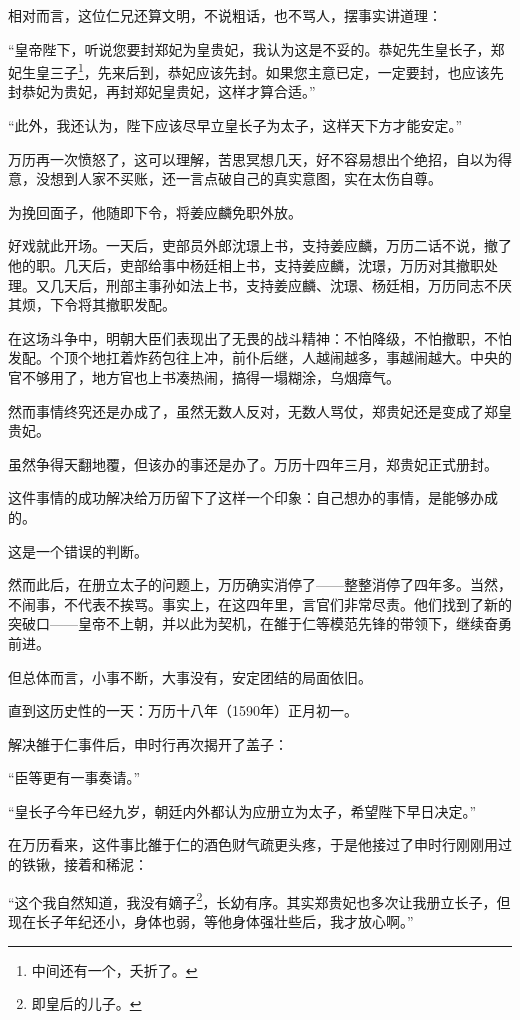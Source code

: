 \begin{multicols}{\theparacolNo}
相对而言，这位仁兄还算文明，不说粗话，也不骂人，摆事实讲道理：

“皇帝陛下，听说您要封郑妃为皇贵妃，我认为这是不妥的。恭妃先生皇长子，郑妃生皇三子\footnote{中间还有一个，夭折了。}，先来后到，恭妃应该先封。如果您主意已定，一定要封，也应该先封恭妃为贵妃，再封郑妃皇贵妃，这样才算合适。”

“此外，我还认为，陛下应该尽早立皇长子为太子，这样天下方才能安定。”

万历再一次愤怒了，这可以理解，苦思冥想几天，好不容易想出个绝招，自以为得意，没想到人家不买账，还一言点破自己的真实意图，实在太伤自尊。

为挽回面子，他随即下令，将姜应麟免职外放。

好戏就此开场。一天后，吏部员外郎沈璟上书，支持姜应麟，万历二话不说，撤了他的职。几天后，吏部给事中杨廷相上书，支持姜应麟，沈璟，万历对其撤职处理。又几天后，刑部主事孙如法上书，支持姜应麟、沈璟、杨廷相，万历同志不厌其烦，下令将其撤职发配。

在这场斗争中，明朝大臣们表现出了无畏的战斗精神：不怕降级，不怕撤职，不怕发配。个顶个地扛着炸药包往上冲，前仆后继，人越闹越多，事越闹越大。中央的官不够用了，地方官也上书凑热闹，搞得一塌糊涂，乌烟瘴气。

然而事情终究还是办成了，虽然无数人反对，无数人骂仗，郑贵妃还是变成了郑皇贵妃。

虽然争得天翻地覆，但该办的事还是办了。万历十四年三月，郑贵妃正式册封。

这件事情的成功解决给万历留下了这样一个印象：自己想办的事情，是能够办成的。

这是一个错误的判断。

然而此后，在册立太子的问题上，万历确实消停了——整整消停了四年多。当然，不闹事，不代表不挨骂。事实上，在这四年里，言官们非常尽责。他们找到了新的突破口——皇帝不上朝，并以此为契机，在雒于仁等模范先锋的带领下，继续奋勇前进。

但总体而言，小事不断，大事没有，安定团结的局面依旧。

直到这历史性的一天：万历十八年（1590年）正月初一。

解决雒于仁事件后，申时行再次揭开了盖子：

“臣等更有一事奏请。”

“皇长子今年已经九岁，朝廷内外都认为应册立为太子，希望陛下早日决定。”

在万历看来，这件事比雒于仁的酒色财气疏更头疼，于是他接过了申时行刚刚用过的铁锹，接着和稀泥：

“这个我自然知道，我没有嫡子\footnote{即皇后的儿子。}，长幼有序。其实郑贵妃也多次让我册立长子，但现在长子年纪还小，身体也弱，等他身体强壮些后，我才放心啊。”


\end{multicols}
